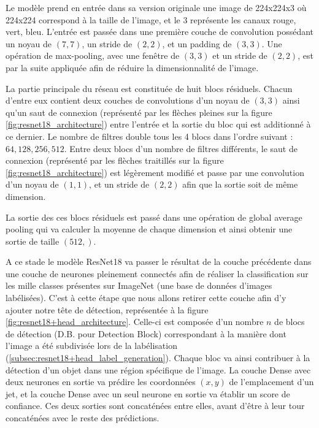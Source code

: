 Le modèle prend en entrée dans sa version originale une image de 224x224x3 où 224x224 correspond à la taille de l'image, et le 3 représente les canaux rouge, vert, bleu. L'entrée est passée dans une première couche de convolution possédant un noyau de $(7,7)$, un stride de $(2,2)$, et un padding de $(3,3)$. Une opération de max-pooling, avec une fenêtre de $(3,3)$ et un stride de $(2,2)$, est par la suite appliquée afin de réduire la dimensionnalité de l'image.

La partie principale du réseau est constituée de huit blocs résiduels. Chacun d'entre eux contient deux couches de convolutions d'un noyau de $(3,3)$ ainsi qu'un saut de connexion (représenté par les flèches pleines sur la figure \ref{fig:resnet18_architecture}) entre l'entrée et la sortie du bloc qui est additionné à ce dernier. Le nombre de filtres double tous les 4 blocs dans l'ordre suivant : $64, 128, 256, 512$. Entre deux blocs d'un nombre de filtres différents, le saut de connexion (représenté par les flèches traitillés sur la figure \ref{fig:resnet18_architecture}) est légèrement modifié et passe par une convolution d'un noyau de $(1,1)$, et un stride de $(2,2)$ afin que la sortie soit de même dimension.

La sortie des ces blocs résiduels est passé dans une opération de global average pooling qui va calculer la moyenne de chaque dimension et ainsi obtenir une sortie de taille $(512,)$.

A ce stade le modèle ResNet18 va passer le résultat de la couche précédente dans une couche de neurones pleinement connectés afin de réaliser la classification sur les mille classes présentes sur ImageNet (une base de données d'images labélisées). C'est à cette étape que nous allons retirer cette couche afin d'y ajouter notre tête de détection, représentée à la figure \ref{fig:resnet18+head_architecture}. Celle-ci est composée d'un nombre $n$ de blocs de détection (D.B. pour Detection Block) correspondant à la manière dont l'image a été subdivisée lors de la labélisation (\ref{subsec:resnet18+head_label_generation}). Chaque bloc va ainsi contribuer à la détection d'un objet dans une région spécifique de l'image. La couche Dense avec deux neurones en sortie va prédire les coordonnées $(x,y)$ de l'emplacement d'un jet, et la couche Dense avec un seul neurone en sortie va établir un score de confiance. Ces deux sorties sont concaténées entre elles, avant d'être à leur tour concaténées avec le reste des prédictions.

